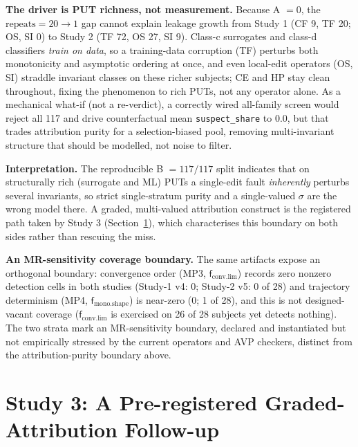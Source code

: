 \documentclass[manuscript,screen,review]{acmart}
\begin{document}
\textbf{The driver is PUT richness, not measurement.} Because A $= 0$, the
$\mathrm{repeats}=20\to1$ gap cannot explain leakage growth from Study 1 (CF 9,
TF 20; OS, SI 0) to Study 2 (TF 72, OS 27, SI 9). Class-c surrogates and class-d
classifiers \emph{train on data}, so a training-data corruption (TF) perturbs
both monotonicity and asymptotic ordering at once, and even local-edit operators
(OS, SI) straddle invariant classes on these richer subjects; CE and HP stay
clean throughout, fixing the phenomenon to rich PUTs, not any operator alone. As
a mechanical what-if (not a re-verdict), a correctly wired all-family screen
would reject all 117 and drive counterfactual mean \texttt{suspect\_share} to
$0.0$, but that trades attribution purity for a selection-biased pool, removing
multi-invariant structure that should be modelled, not noise to filter.

\textbf{Interpretation.} The reproducible B $= 117/117$ split indicates that on
structurally rich (surrogate and ML) PUTs a single-edit fault \emph{inherently}
perturbs several invariants, so strict single-stratum purity and a single-valued
$\sigma$ are the wrong model there. A graded, multi-valued attribution construct
is the registered path taken by Study 3
(Section~\ref{study3-attribution-boundary}), which characterises this boundary
on both sides rather than rescuing the miss.

\textbf{An MR-sensitivity coverage boundary.} The same artifacts expose an
orthogonal boundary: convergence order (MP3, $\mathsf{f}_{\mathrm{conv.lim}}$) records zero
nonzero detection cells in both studies (Study-1 v4: 0; Study-2 v5: 0 of 28) and
trajectory determinism (MP4, $\mathsf{f}_{\mathrm{mono.shape}}$) is near-zero (0; 1 of 28), and
this is not designed-vacant coverage ($\mathsf{f}_{\mathrm{conv.lim}}$ is exercised on 26 of
28 subjects yet detects nothing). The two strata mark an MR-sensitivity boundary,
declared and instantiated but not empirically stressed by the current operators
and AVP checkers, distinct from the attribution-purity boundary above.

\section{Study 3: A Pre-registered Graded-Attribution Follow-up}\label{study3-attribution-boundary}
\end{document}
